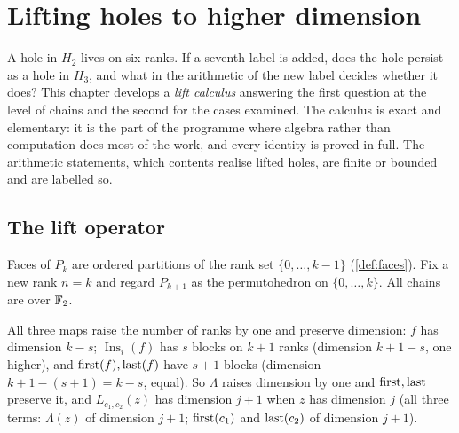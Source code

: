 \chapter{Lifting holes to higher dimension}\label{ch:dimension}

A hole in $H_2$ lives on six ranks. If a seventh label is added, does the hole persist as a hole in $H_3$, and what in the arithmetic of the new label decides whether it does? This chapter develops a \emph{lift calculus} answering the first question at the level of chains and the second for the cases examined. The calculus is exact and elementary: it is the part of the programme where algebra rather than computation does most of the work, and every identity is proved in full. The arithmetic statements, which contents realise lifted holes, are finite or bounded and are labelled so.

\section{The lift operator}\label{sec:lift}
Faces of $P_k$ are ordered partitions of the rank set $\{0,\dots,k-1\}$ (\cref{def:faces}). Fix a new rank $n=k$ and regard $P_{k+1}$ as the permutohedron on $\{0,\dots,k\}$. All chains are over $\mathbb{F}_2$.
All three maps raise the number of ranks by one and preserve dimension: $f$ has dimension $k-s$; $\operatorname{Ins}_i(f)$ has $s$ blocks on $k{+}1$ ranks (dimension $k{+}1-s$, one higher), and $\mathrm{first}(f),\mathrm{last}(f)$ have $s{+}1$ blocks (dimension $k{+}1-(s{+}1)=k-s$, equal). So $\Lambda$ raises dimension by one and $\mathrm{first},\mathrm{last}$ preserve it, and $L_{c_1,c_2}(z)$ has dimension $j{+}1$ when $z$ has dimension $j$ (all three terms: $\Lambda(z)$ of dimension $j{+}1$; $\mathrm{first}(c_1)$ and $\mathrm{last}(c_2)$ of dimension $j{+}1$).

